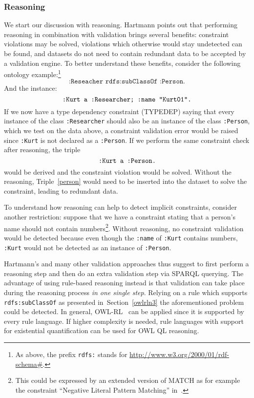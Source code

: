 \subsubsection{Reasoning}\label{reasoning}
We start our discussion with reasoning. Hartmann \cite[p. 181]{hartmann2016} points out that performing reasoning in combination with \rdf validation brings several benefits:
constraint violations may be solved, violations which otherwise would stay undetected can be found, and datasets do not need to contain 
redundant data to be accepted by a validation engine. To better understand these benefits, consider the following ontology example:\footnote{As above, the prefix \texttt{rdfs:} 
stands for \url{http://www.w3.org/2000/01/rdf-schema\#}.}
\begin{equation}\label{subc}
 \texttt{:Reseacher rdfs:subClassOf :Person.}
\end{equation}
And the instance:
\begin{equation}\label{Kurt}
 \verb!:Kurt a :Researcher; :name "Kurt01".!
\end{equation}
If we now have a type dependency constraint (TYPEDEP) saying that every instance of the class \texttt{:Researcher} should also be an instance of the class \texttt{:Person}, 
which we test on the data above,
a constraint validation error would be raised since \texttt{:Kurt} is not declared as a \texttt{:Person}. If we perform the same constraint check after reasoning, the triple
\begin{equation}\label{person}
\verb!:Kurt a :Person.!
\end{equation}
would be derived and the constraint violation would be solved. Without the reasoning, Triple~\ref{person}
would need to be inserted into the dataset to solve the constraint,
leading to redundant data. 

To understand how reasoning 
can help to detect implicit constraints, consider another restriction: suppose that we have a constraint stating that a person's name should not contain 
numbers\footnote{This could be expressed by an extended version of MATCH as for example the constraint ``Negative Literal Pattern Matching'' in~\cite{hartmann2016}.}.
Without reasoning, no constraint validation would be detected because even though the \texttt{:name} of \texttt{:Kurt} contains numbers, \texttt{:Kurt} 
would not be detected as an instance of
\texttt{:Person}.


Hartmann's and many other validation approaches thus suggest to first perform a reasoning step and then do an extra validation step via SPARQL querying. 
The advantage of using rule-based reasoning instead is
that validation can take place during the reasoning process \emph{in one single step}. 
Relying on a rule which supports \texttt{rdfs:subClassOf} as  presented 
in~Section~\ref{owlrln3} the aforementioned problem could be detected.
In general, OWL-RL~\cite{OWLRL} can be applied since it is supported by every rule language.
If higher complexity is needed, rule languages with support for existential quantification can be used for OWL QL reasoning.


